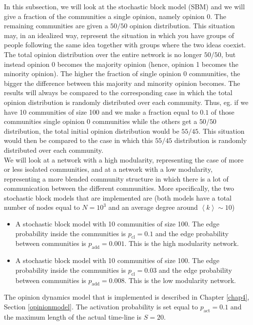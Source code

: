 \documentclass[11 pt , letterpaper , twoside , openright]{book}
\begin{document}
In this subsection, we will look at the stochastic block model (SBM) and we will give a fraction of the communities a single opinion, namely opinion 0. The remaining communities are given a $50/50$ opinion distribution. This situation may, in an idealized way, represent the situation in which you have groups of people following the same idea together with groups where the two ideas coexist. The total opinion distribution over the entire network is no longer $50/50$, but instead opinion 0 becomes the majority opinion (hence, opinion 1 becomes the minority opinion). The higher the fraction of single opinion 0 communities, the bigger the difference between this majority and minority opinion becomes. The results will always be compared to the corresponding case in which the total opinion distribution is randomly distributed over each community. Thus, eg. if we have 10 communities of size 100 and we make a fraction equal to $0.1$ of those communities single opinion 0 communities while the others get a $50/50$ distribution, the total initial opinion distribution would be $55/45$. This situation would then be compared to the case in which this $55/45$ distribution is randomly distributed over each community.\\ 
We will look at a network with a high modularity, representing the case of more or less isolated communities, and at a network with a low modularity, representing a more blended community structure in which there is a lot of communication between the different communities. More specifically, the two stochastic block models that are implemented are (both models have a total number of nodes equal to $N = 10^3$ and an average degree around $\left<k\right> \sim 10$)
\begin{itemize}
	\item A stochastic block model with 10 communities of size 100. The edge probability inside the communities is $p_{\text{cl}} = 0.1$ and the edge probability between communities is $p_{\text{add}} = 0.001$. This is the high modularity network.
	\item A stochastic block model with 10 communities of size 100. The edge probability inside the communities is $p_{\text{cl}} = 0.03$ and the edge probability between communities is $p_{\text{add}} = 0.008$. This is the low modularity network.
\end{itemize} 
The opinion dynamics model that is implemented is described in Chapter \ref{chap4}, Section \ref{opinionmodel}. The activation probability is set equal to $p_{\text{act}} = 0.1$ and the maximum length of the actual time-line is $S=20$. %
\end{document}
